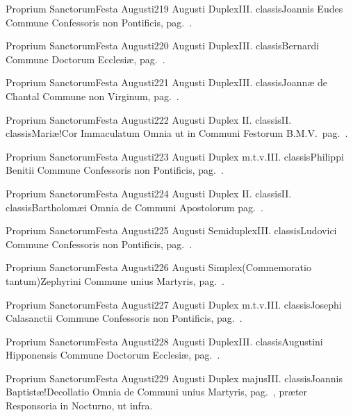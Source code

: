 \documentclass[nocturnale-romanum.tex]{subfiles}
\begin{document}
	{Proprium Sanctorum}{Festa Augusti}{2}{19 Augusti}
	{Duplex}{III. classis}{Joannis Eudes}
	{Commune Confessoris non Pontificis, pag.\ \pageref{M-CONP}.}
	{}

	{Proprium Sanctorum}{Festa Augusti}{2}{20 Augusti}
	{Duplex}{III. classis}{Bernardi}
	{Commune Doctorum Ecclesiæ, pag.\ \pageref{M-CODO}.}
	{}

	{Proprium Sanctorum}{Festa Augusti}{2}{21 Augusti}
	{Duplex}{III. classis}{Joannæ de Chantal}
	{Commune non Virginum, pag.\ \pageref{M-MU}.}
	{}

	{Proprium Sanctorum}{Festa Augusti}{2}{22 Augusti}
	{Duplex II. classis}{II. classis}{Mariæ!Cor Immaculatum}
	{Omnia ut in Communi Festorum B.M.V.\ pag.\ \pageref{M-CBMV}.}
	{}

	{Proprium Sanctorum}{Festa Augusti}{2}{23 Augusti}
	{Duplex m.t.v.}{III. classis}{Philippi Benitii}
	{Commune Confessoris non Pontificis, pag.\ \pageref{M-CONP}.}
	{}

	{Proprium Sanctorum}{Festa Augusti}{2}{24 Augusti}
	{Duplex II. classis}{II. classis}{Bartholomæi}
	{Omnia de Communi Apostolorum pag.\ \pageref{M-APEX}.}
	{}

	{Proprium Sanctorum}{Festa Augusti}{2}{25 Augusti}
	{Semiduplex}{III. classis}{Ludovici}
	{Commune Confessoris non Pontificis, pag.\ \pageref{M-CONP}.}
	{}

	{Proprium Sanctorum}{Festa Augusti}{2}{26 Augusti}
	{Simplex}{(Commemoratio tantum)}{Zephyrini}
	{Commune unius Martyris, pag.\ \pageref{M-UMEX}.}
	{}

	{Proprium Sanctorum}{Festa Augusti}{2}{27 Augusti}
	{Duplex m.t.v.}{III. classis}{Josephi Calasanctii}
	{Commune Confessoris non Pontificis, pag.\ \pageref{M-CONP}.}
	{}

	{Proprium Sanctorum}{Festa Augusti}{2}{28 Augusti}
	{Duplex}{III. classis}{Augustini Hipponensis}
	{Commune Doctorum Ecclesiæ, pag.\ \pageref{M-CODO}.}
	{}

	{Proprium Sanctorum}{Festa Augusti}{2}{29 Augusti}
	{Duplex majus}{III. classis}{Joannis Baptistæ!Decollatio}
	{Omnia de Communi unius Martyris, pag.\ \pageref{M-UMEX}, præter Responsoria in  Nocturno, ut infra.}
	{}
\tedeumrubric
\end{document}
